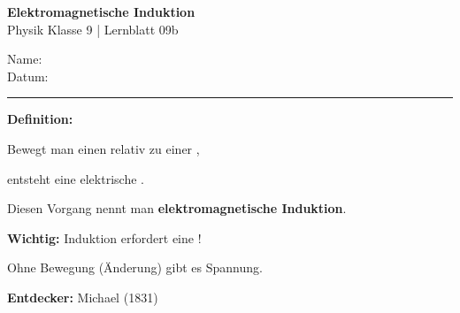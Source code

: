 \documentclass[a4paper,11pt]{article}
\newcommand{\luecke}[1]{\underline{\hspace{#1}}}
\begin{document}

\begin{minipage}{0.6\textwidth}
{\Large\bfseries\color{physik}Elektromagnetische Induktion}\\[2mm]
{\small Physik Klasse 9 | Lernblatt 09b}
\end{minipage}
\hfill
\begin{minipage}{0.35\textwidth}
\raggedleft
Name: \luecke{4cm}\\[2mm]
Datum: \luecke{2.5cm}
\end{minipage}

\vspace{3mm}
\hrule
\vspace{5mm}


\begin{merkbox}

\textbf{Definition:}

Bewegt man einen \luecke{2.5cm} relativ zu einer \luecke{2.5cm},

entsteht eine elektrische \luecke{2.5cm}.

Diesen Vorgang nennt man \textbf{elektromagnetische Induktion}.

\vspace{3mm}
\textbf{Wichtig:} Induktion erfordert eine \luecke{3cm}!

Ohne Bewegung (Änderung) gibt es \luecke{2.5cm} Spannung.

\vspace{3mm}
\textbf{Entdecker:} Michael \luecke{2.5cm} (1831)

\end{merkbox}

\vspace{4mm}

\end{document}
